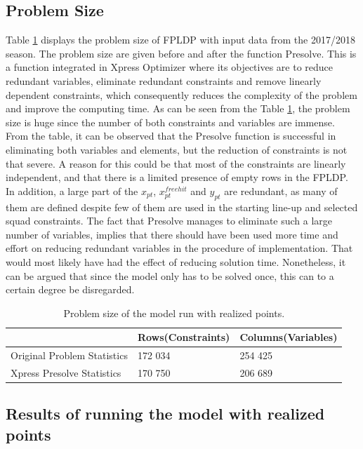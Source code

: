 \subsection{Problem Size}

Table \ref{tab:computational_statistics} displays the problem size of FPLDP with input data from the 2017/2018 season. The problem size are given before and after the function Presolve. This is a function integrated in Xpress Optimizer where its objectives are to reduce redundant variables, eliminate redundant constraints and remove linearly dependent constraints, which consequently reduces the complexity of the problem and improve the computing time. As can be seen from the Table \ref{tab:computational_statistics}, the problem size is huge since the number of both constraints and variables are immense. From the table, it can be observed that the Presolve function is successful in eliminating both variables and elements, but the reduction of constraints is not that severe. A reason for this could be that most of the constraints are linearly independent, and that there is a limited presence of empty rows in the FPLDP. In addition, a large part of the $x_{pt}$, $x_{pt}^{freehit}$ and $y_{pt}$ are redundant, as many of them are defined despite few of them are used in the starting line-up and selected squad constraints. The fact that Presolve manages to eliminate such a large number of variables, implies that there should have been used more time and effort on reducing redundant variables in the procedure of implementation. That would most likely have had the effect of reducing solution time. Nonetheless, it can be argued that since the model only has to be solved once, this can to a certain degree be disregarded. 


\begin{table}[H]
\centering
\begin{tabular}{@{}lll@{}}
\toprule
                            & Rows(Constraints)    & Columns(Variables) 
                            \\ \midrule
Original Problem Statistics & 172 034 & 254 425   \\
Xpress Presolve Statistics  & 170 750 & 206 689   \\ 
\bottomrule
\end{tabular}
\caption{Problem size of the model run with realized points.}
\label{tab:computational_statistics}
\end{table}


\subsection{Results of running the model with realized points}

